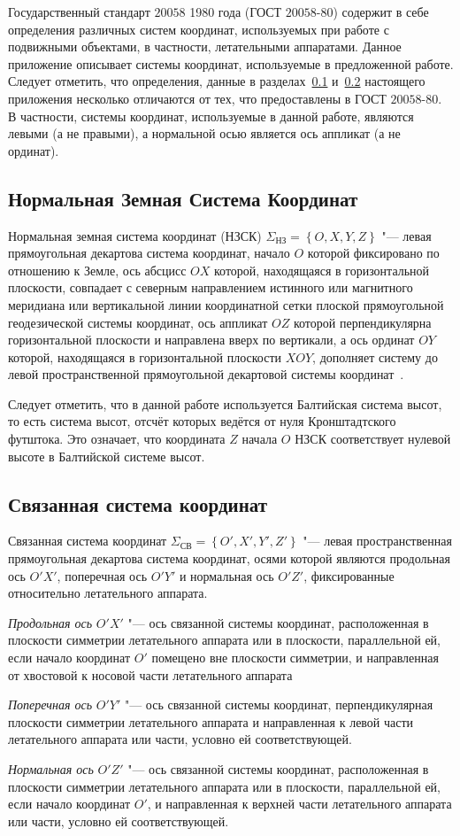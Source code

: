 \documentclass[../main.tex]{subfiles}
\begin{document}
Государственный стандарт $20058$ 1980 года (ГОСТ $20058$-$80$) содержит в себе определения различных систем координат, используемых при работе с подвижными объектами, в частности, летательными аппаратами. Данное приложение описывает системы координат, используемые в предложенной работе. Следует отметить, что определения, данные в разделах~\ref{sec:nzsk} и~\ref{sec:ssk} настоящего приложения несколько отличаются от тех, что предоставлены в ГОСТ $20058$-$80$. В частности, системы координат, используемые в данной работе, являются левыми (а не правыми), а нормальной осью является ось аппликат (а не ординат).

\subsection{Нормальная Земная Система Координат}\label{sec:nzsk}
Нормальная земная система координат (НЗСК) $\Sigma_{\text{НЗ}} = \left\{O, X, Y, Z\right\}$ "--- левая прямоугольная декартова система координат, начало $O$ которой фиксировано по отношению к Земле, ось абсцисс $OX$ которой, находящаяся в горизонтальной плоскости, совпадает с северным направлением истинного или магнитного меридиана или вертикальной линии координатной сетки плоской прямоугольной геодезической системы координат, ось аппликат $OZ$ которой перпендикулярна горизонтальной плоскости и направлена вверх по вертикали, а ось ординат $OY$ которой, находящаяся в горизонтальной плоскости $XOY$, дополняет систему до левой пространственной прямоугольной декартовой системы координат~\cite{GOST-CS:1980}.

Следует отметить, что в данной работе используется Балтийская система высот, то есть система высот, отсчёт которых ведётся от нуля Кронштадтского футштока. Это означает, что координата $Z$ начала $O$ НЗСК соответствует нулевой высоте в Балтийской системе высот.

\subsection{Связанная система координат}\label{sec:ssk}
Связанная система координат $\Sigma_{\text{СВ}} = \left\{O', X', Y', Z'\right\}$ "--- левая пространственная прямоугольная декартова система координат, осями которой являются продольная ось $O'X'$, поперечная ось $O'Y'$ и нормальная ось $O'Z'$, фиксированные относительно летательного аппарата.

\textit{Продольная ось} $O'X'$ "--- ось связанной системы координат, расположенная в плоскости симметрии летательного аппарата или в плоскости, параллельной ей, если начало координат $O'$ помещено вне плоскости симметрии, и направленная от хвостовой к носовой части летательного аппарата

\textit{Поперечная ось} $O'Y'$ "--- ось связанной системы координат, перпендикулярная плоскости симметрии летательного аппарата и направленная к левой части летательного аппарата или части, условно ей соответствующей.

\textit{Нормальная ось} $O'Z'$ "--- ось связанной системы координат, расположенная в плоскости симметрии летательного аппарата или в плоскости, параллельной ей, если начало координат $O'$, и направленная к верхней части летательного аппарата или части, условно ей соответствующей.
\end{document}
